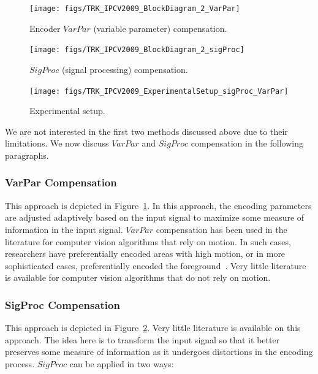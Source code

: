 \documentclass{article}
\begin{document}

			\begin{figure}
						\centering
						\texttt{[image: figs/TRK\_IPCV2009\_BlockDiagram\_2\_VarPar]}
						\caption{Encoder $VarPar$ (variable parameter) compensation.}
						\label{fig:SolutionThroughVarPar}
			\end{figure}

			\begin{figure}
						\centering
						\texttt{[image: figs/TRK\_IPCV2009\_BlockDiagram\_2\_sigProc]}
						\caption{$SigProc$ (signal processing) compensation.}
						\label{fig:SolutionThroughSigProc}
			\end{figure}

			\begin{figure}
					\texttt{[image: figs/TRK\_IPCV2009\_ExperimentalSetup\_sigProc\_VarPar]}
					\caption{Experimental setup.}
					\label{fig:ExperimentalSetup}
			\end{figure}

We are not interested in the first two methods discussed above due to their limitations.  We now discuss $VarPar$ and $SigProc$ compensation in the following paragraphs.

\subsubsection{VarPar Compensation}
This approach is depicted in Figure~\ref{fig:SolutionThroughVarPar}.  In this approach, the encoding parameters are adjusted adaptively based on the input signal to maximize some measure of information in the input signal.  $VarPar$ compensation has been used in the literature for computer vision algorithms that rely on motion.  In such cases, researchers have preferentially encoded areas with high motion, or in more sophisticated cases, preferentially encoded the foreground~\cite{2005_CNF_SceneAnalysisForJPEG2000_Meessen}.  Very little literature is available for computer vision algorithms that do not rely on motion. 

\subsubsection{SigProc Compensation}
This approach is depicted in Figure~\ref{fig:SolutionThroughSigProc}.  Very little literature is available on this approach.  The idea here is to transform the input signal so that it better preserves some measure of information as it undergoes distortions in the encoding process.  $SigProc$ can be applied in two ways:
\end{document}
